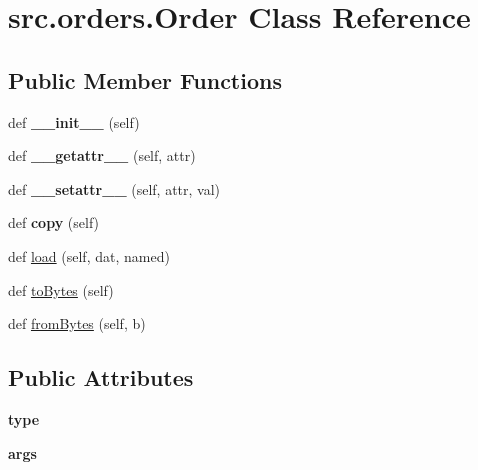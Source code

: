 \hypertarget{classsrc_1_1orders_1_1_order}{}\section{src.\+orders.\+Order Class Reference}
\label{classsrc_1_1orders_1_1_order}
\subsection*{Public Member Functions}
\begin{DoxyCompactItemize}
\item 
\hypertarget{classsrc_1_1orders_1_1_order_a28bd8660dc7a0a5d33a0654834f812ea}{}\label{classsrc_1_1orders_1_1_order_a28bd8660dc7a0a5d33a0654834f812ea} 
def {\bfseries \+\_\+\+\_\+init\+\_\+\+\_\+} (self)
\item 
\hypertarget{classsrc_1_1orders_1_1_order_a85226f07d2c775977835c77c77332c81}{}\label{classsrc_1_1orders_1_1_order_a85226f07d2c775977835c77c77332c81} 
def {\bfseries \+\_\+\+\_\+getattr\+\_\+\+\_\+} (self, attr)
\item 
\hypertarget{classsrc_1_1orders_1_1_order_af69420c346616a349099033b5f8a20b2}{}\label{classsrc_1_1orders_1_1_order_af69420c346616a349099033b5f8a20b2} 
def {\bfseries \+\_\+\+\_\+setattr\+\_\+\+\_\+} (self, attr, val)
\item 
\hypertarget{classsrc_1_1orders_1_1_order_a523211a5bf2d0a2ad5c671833a61d3b8}{}\label{classsrc_1_1orders_1_1_order_a523211a5bf2d0a2ad5c671833a61d3b8} 
def {\bfseries copy} (self)
\item 
def \hyperlink{classsrc_1_1orders_1_1_order_a1438c0601f3b3f0d9d0c2f10a92ef005}{load} (self, dat, named)
\item 
def \hyperlink{classsrc_1_1orders_1_1_order_a294bf5c8b77a05db611e3a4001a71494}{to\+Bytes} (self)
\item 
def \hyperlink{classsrc_1_1orders_1_1_order_a18fc5c9c0f07bb4c96168e99457a1445}{from\+Bytes} (self, b)
\end{DoxyCompactItemize}
\subsection*{Public Attributes}
\begin{DoxyCompactItemize}
\item 
\hypertarget{classsrc_1_1orders_1_1_order_a73c2ef5d7d5d6ab02bd79a880c81e2ec}{}\label{classsrc_1_1orders_1_1_order_a73c2ef5d7d5d6ab02bd79a880c81e2ec} 
{\bfseries type}
\item 
\hypertarget{classsrc_1_1orders_1_1_order_a32051284f59de0db40bef2fae1c599a2}{}\label{classsrc_1_1orders_1_1_order_a32051284f59de0db40bef2fae1c599a2} 
{\bfseries args}
\end{DoxyCompactItemize}
